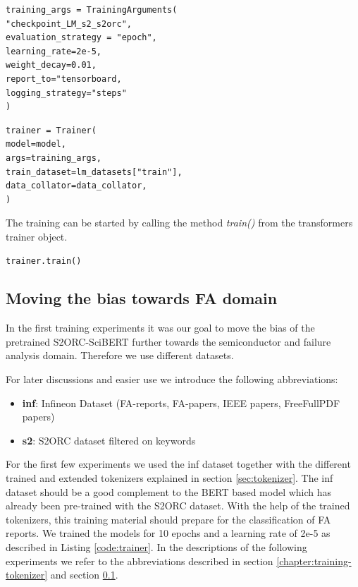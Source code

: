 \begin{code}
	\label{code:train_args}
\begin{verbatim}
training_args = TrainingArguments(
"checkpoint_LM_s2_s2orc",
evaluation_strategy = "epoch",
learning_rate=2e-5,
weight_decay=0.01,
report_to="tensorboard,
logging_strategy="steps"
)
\end{verbatim}
\end{code}

\begin{code}
	\label{code:trainer}
\begin{verbatim}
trainer = Trainer(
model=model,
args=training_args,
train_dataset=lm_datasets["train"],
data_collator=data_collator,
)
\end{verbatim}
\end{code}

The training can be started by calling the method \textit{train()} from the \alert{transformers trainer object.}
\begin{code}
	\label{code:train}
\begin{verbatim}
trainer.train()
\end{verbatim}
\end{code}

\subsection{Moving the bias towards FA domain}\label{chapter:training-experiments}
In the first training experiments it was our goal to move the bias of the pretrained S2ORC-SciBERT further towards the semiconductor and failure analysis domain. Therefore we use different datasets. 

For later discussions and easier use we introduce the following abbreviations:
\begin{itemize}
	\item \textbf{inf}: Infineon Dataset (FA-reports, FA-papers, IEEE papers, FreeFullPDF papers)
	\item \textbf{s2}: S2ORC dataset filtered on keywords
\end{itemize}

For the first few experiments we used the inf dataset together with the different trained and extended tokenizers explained in section \ref{sec:tokenizer}. The inf dataset should be a good complement to the BERT based model which has already been pre-trained with the S2ORC dataset. With the help of the trained tokenizers, this training material should prepare for the classification of FA reports. We trained the models for 10 epochs and a learning rate of 2e-5 as described in Listing \ref{code:trainer}. In the descriptions of the following experiments we refer to the abbreviations described in section \ref{chapter:training-tokenizer} and section \ref{chapter:training-experiments}. \newline

